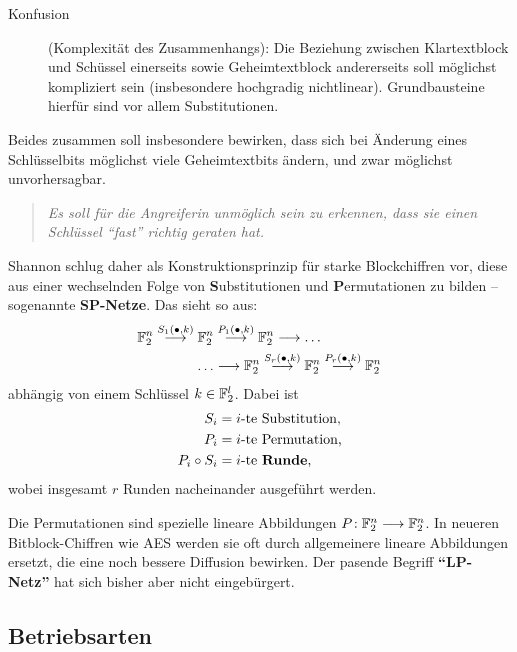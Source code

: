 \begin{refsegment}
\begin{description}
\item[Konfusion] (Komplexität des Zusammenhangs): Die Beziehung
    zwischen Klartextblock und Schüssel einerseits sowie Geheimtextblock
    andererseits soll möglichst kompliziert sein
    (insbesondere hochgradig nichtlinear).
    Grundbausteine hierfür sind vor allem Substitutionen.
\end{description}
Beides zusammen soll insbesondere bewirken, dass sich bei Änderung
eines Schlüsselbits möglichst viele Geheimtextbits ändern, und zwar
möglichst unvorhersagbar.
\begin{quote}
   {\em Es soll für die Angreiferin unmöglich sein zu erkennen,
   dass sie einen Schlüssel "`fast"' richtig geraten hat.}
\end{quote}
Shannon schlug daher als Konstruktionsprinzip
für starke Blockchiffren vor,
diese aus einer wechselnden Folge von {\bf S}ubstitutionen und
{\bf P}ermutationen zu bilden -- sogenannte {\bf SP-Netze}.
Das sieht so aus:
\begin{align*}
    \mathbb{F}_2^n \stackrel{S_1(\bullet,k)}{\longrightarrow} \mathbb{F}_2^n &
       \stackrel{P_1(\bullet,k)}{\longrightarrow}
       \mathbb{F}_2^n \longrightarrow \ldots \\
    \ldots &\longrightarrow
       \mathbb{F}_2^n \stackrel{S_r(\bullet,k)}{\longrightarrow}
       \mathbb{F}_2^n \stackrel{P_r(\bullet,k)}{\longrightarrow} \mathbb{F}_2^n
\end{align*}
abhängig von einem Schlüssel $k \in \mathbb{F}_2^l$. Dabei ist
\begin{align*}
    S_i & = \text{$i$-te Substitution,} \\
    P_i & = \text{$i$-te Permutation,} \\
    P_i \circ S_i & = \text{$i$-te {\bf Runde},}
\end{align*}
wobei insgesamt $r$ Runden nacheinander ausgeführt werden.

Die Permutationen sind spezielle lineare
Abbildungen
$P\!: \mathbb{F}_2^n \longrightarrow \mathbb{F}_2^n$. In neueren Bitblock-Chiffren
wie AES werden sie oft durch allgemeinere lineare
Abbildungen ersetzt, die eine noch bessere Diffusion bewirken.
Der pasende Begriff {\bf "`LP-Netz"'} hat sich
bisher aber nicht eingebürgert.

\subsection{Betriebsarten}\label{ss-bool-modi}


\end{refsegment}
